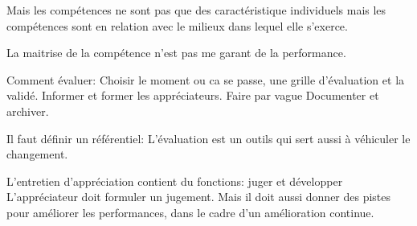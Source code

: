 Mais les compétences ne sont pas que des caractéristique individuels mais les compétences sont en relation avec le milieux dans lequel elle s'exerce. 

La maitrise de la compétence n'est pas me garant de la performance. 

Comment évaluer: Choisir le moment ou ca se passe, une grille d'évaluation et la validé.
Informer et former les appréciateurs.
Faire par vague
Documenter et archiver.

Il faut définir un référentiel: L'évaluation est un outils qui sert aussi à véhiculer le changement. 

L'entretien d'appréciation contient du fonctions: juger et développer 
L'appréciateur doit formuler un jugement. 
Mais il doit aussi donner des pistes pour améliorer les performances, dans le cadre d'un amélioration continue.
